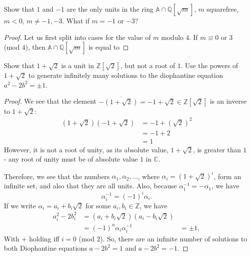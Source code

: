 \documentclass[12pt]{article}
\newcommand{\Q}{\mathbb{Q}}
\newcommand{\Z}{\mathbb{Z}}
\newcommand{\C}{\mathbb{C}}
\theoremstyle{definition}
\newenvironment{problem}[2][Problem]{\begin{trivlist}
\item[\hskip \labelsep {\bfseries #1}\hskip \labelsep {\bfseries #2.}]}{\end{trivlist}}
\begin{document}
\begin{problem}{13}
	Show that $1$ and $-1$ are the only units in the ring $\mathbb A \cap \Q[\sqrt m]$, $m$ squarefree, $m < 0$, $m \neq -1, -3$. What if $m = -1$ or $-3$?
	\begin{proof} 
		Let us first split into cases for the value of $m$ modulo $4$. If $m \equiv 0$ or $3$ (mod $4$), then $\mathbb A \cap \Q[\sqrt m]$ is equal to 
	\end{proof}
\end{problem}
\begin{problem}{14}
	Show that $1 + \sqrt 2$ is a unit in $\Z[\sqrt 2]$, but not a root of $1$. Use the powers of $1 + \sqrt 2$ to generate infinitely many solutions to the diophantine equation $a^2 - 2b^2 = \pm 1$.
	\begin{proof}
		We see that the element $-\overline{(1 + \sqrt{2})} = -1 + \sqrt 2 \in \Z[\sqrt 2]$ is an inverse to $1 + \sqrt 2$:
		\begin{align*}
			(1 + \sqrt 2)(-1 + \sqrt 2) &= -1 + (\sqrt{2})^2\\
			&= -1 + 2\\
			&= 1
		\end{align*}
		However, it is not a root of unity, as its absolute value, $1 + \sqrt 2$, is greater than $1$ - any root of unity must be of absolute value $1$ in $\C$.
		\par Therefore, we see that the numbers $\alpha_1, \alpha_2, \dots $, where $\alpha_i = (1 + \sqrt 2)^i$, form an infinite set, and also that they are all units. Also, because $\alpha_1^{-1} = - \overline{\alpha_1}$, we have
	\[\alpha_i^{-1} = (-1)^i\overline{\alpha_i}.\]
	If we write $\alpha_i = a_i + b_i\sqrt{2}$ for some $a_i, b_i \in \Z$, we have
	\begin{align*}
		a_i^2 - 2b_i^2 &= (a_i + b_i \sqrt{2})(a_i - b_i \sqrt{2})\\
		&= (-1)^n \alpha_i \alpha_i^{-1}
		&= \pm 1,
	\end{align*}
	With $+$ holding iff $i = 0$ (mod $2$). So, there are an infinite number of solutions to both Diophantine equations $a - 2b^2 = 1$ and $a - 2b^2 = -1$.
	\end{proof}
\end{problem}
\end{document}
